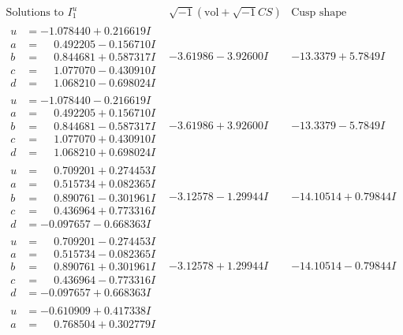 \documentclass[1p]{elsarticle_modified}
\theoremstyle{definition}
\newcommand{\I}{\sqrt{-1}}
\begin{document}
$$\begin{array}{c|c|c}  
\text{Solutions to }I^u_{1}& \I (\text{vol} + \sqrt{-1}CS) & \text{Cusp shape}\\
 \hline 
\begin{aligned}
u &= -1.078440 + 0.216619 I \\
a &= \phantom{-}0.492205 - 0.156710 I \\
b &= \phantom{-}0.844681 + 0.587317 I \\
c &= \phantom{-}1.077070 - 0.430910 I \\
d &= \phantom{-}1.068210 - 0.698024 I\end{aligned}
 & -3.61986 - 3.92600 I & -13.3379 + 5.7849 I \\ \hline\begin{aligned}
u &= -1.078440 - 0.216619 I \\
a &= \phantom{-}0.492205 + 0.156710 I \\
b &= \phantom{-}0.844681 - 0.587317 I \\
c &= \phantom{-}1.077070 + 0.430910 I \\
d &= \phantom{-}1.068210 + 0.698024 I\end{aligned}
 & -3.61986 + 3.92600 I & -13.3379 - 5.7849 I \\ \hline\begin{aligned}
u &= \phantom{-}0.709201 + 0.274453 I \\
a &= \phantom{-}0.515734 + 0.082365 I \\
b &= \phantom{-}0.890761 - 0.301961 I \\
c &= \phantom{-}0.436964 + 0.773316 I \\
d &= -0.097657 - 0.668363 I\end{aligned}
 & -3.12578 - 1.29944 I & -14.10514 + 0.79844 I \\ \hline\begin{aligned}
u &= \phantom{-}0.709201 - 0.274453 I \\
a &= \phantom{-}0.515734 - 0.082365 I \\
b &= \phantom{-}0.890761 + 0.301961 I \\
c &= \phantom{-}0.436964 - 0.773316 I \\
d &= -0.097657 + 0.668363 I\end{aligned}
 & -3.12578 + 1.29944 I & -14.10514 - 0.79844 I \\ \hline\begin{aligned}
u &= -0.610909 + 0.417338 I \\
a &= \phantom{-}0.768504 + 0.302779 I \\

\end{aligned}
\end{array}$$
\end{document}
